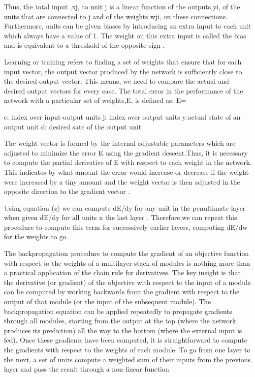 Thus, the total input ,xj, to unit j is a linear function of the outputs,yi, of the units that are connected to j and of the weights wji, on these connections. Furthermore, units can be given biases by introducing an extra input to each unit which always have a value of 1. The weight on this extra input is called the bias and is equivalent to a threshold of the opposite sign \cite{polk2002cognitive}.

Learning or training refers to finding a set of weights that ensure that for each input vector, the output vector produced by the network is sufficiently close to the desired output vector\cite{polk2002cognitive}. This means, we need to compare the actual and desired output vectors for every case. The total error in the performance of the network with a particular set of weights,E, is defined as:
E=

c; index over input-output units
j: index over output units
y:actual state of an output unit
d: desired sate of the output unit

The weight vector is formed by the internal adjustable parameters which are adjusted to minimize the error E using the gradient descent.Thus, it is necessary to compute the partial derivative of E with respect to each weight in the network. This indicates by what amount the error would increase or decrease if the weight were increased by a tiny amount and the weight vector is then adjusted in the opposite direction to the gradient vector \cite{lecun2015deep}. 

Using equation (z) we can compute dE/dy for any unit in the penultimate layer when given dE/dy for all units n the last layer \cite{polk2002cognitive}. Therefore,we can repeat this procedure to compute this term for successively earlier layers, computing dE/dw for the weights to go. 

The backpropagation procedure to compute the gradient of an objective function with respect to the weights of a multilayer stack of modules is nothing more than a practical application of the chain rule for derivatives. The key insight is that the derivative (or gradient)
of the objective with respect to the input of a module can be computed by working backwards from the gradient with respect to the output of that module (or the input of the subsequent module). The backpropagation equation can be applied repeatedly to propagate gradients through all modules, starting from the output at the top (where the network produces its prediction) all the way to the bottom (where the external input is fed). Once these gradients have been computed, it is straightforward to compute the gradients with respect to the weights of each module. To go from one layer to the next, a set of units compute a weighted sum of their inputs from the previous layer and pass the result through a non-linear function \cite{lecun2015deep}

